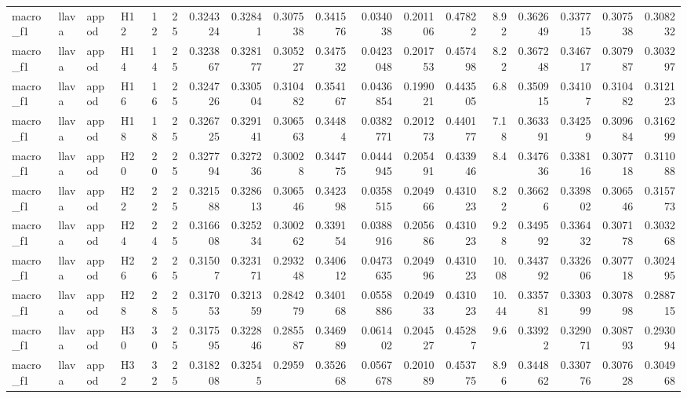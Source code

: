 \begin{longtable}{llllrrrrrrrrrrrrrr}
macro\_f1 & llava & appod & H12 & 12 & 25 & 0.324324 & 0.32841 & 0.307538 & 0.341576 & 0.034038 & 0.201106 & 0.47822 & 8.92 & 0.362649 & 0.337715 & 0.307538 & 0.308232 \\
macro\_f1 & llava & appod & H14 & 14 & 25 & 0.323867 & 0.328177 & 0.305227 & 0.347532 & 0.0423048 & 0.201753 & 0.457498 & 8.22 & 0.367248 & 0.346717 & 0.307987 & 0.303297 \\
macro\_f1 & llava & appod & H16 & 16 & 25 & 0.324726 & 0.330504 & 0.310482 & 0.354167 & 0.0436854 & 0.199021 & 0.443505 & 6.8 & 0.350915 & 0.34107 & 0.310482 & 0.312123 \\
macro\_f1 & llava & appod & H18 & 18 & 25 & 0.326725 & 0.329141 & 0.306563 & 0.34484 & 0.0382771 & 0.201273 & 0.440177 & 7.18 & 0.363391 & 0.34259 & 0.309684 & 0.316299 \\
macro\_f1 & llava & appod & H20 & 20 & 25 & 0.327794 & 0.327236 & 0.30028 & 0.344775 & 0.0444945 & 0.205491 & 0.433946 & 8.4 & 0.347636 & 0.338116 & 0.307718 & 0.311088 \\
macro\_f1 & llava & appod & H22 & 22 & 25 & 0.321588 & 0.328613 & 0.306546 & 0.342398 & 0.0358515 & 0.204966 & 0.431023 & 8.22 & 0.36626 & 0.339802 & 0.306546 & 0.315773 \\
macro\_f1 & llava & appod & H24 & 24 & 25 & 0.316608 & 0.325234 & 0.300262 & 0.339154 & 0.0388916 & 0.205686 & 0.431023 & 9.28 & 0.349592 & 0.336432 & 0.307178 & 0.303268 \\
macro\_f1 & llava & appod & H26 & 26 & 25 & 0.31507 & 0.323171 & 0.293248 & 0.340612 & 0.0473635 & 0.204996 & 0.431023 & 10.08 & 0.343792 & 0.332606 & 0.307718 & 0.302495 \\
macro\_f1 & llava & appod & H28 & 28 & 25 & 0.317053 & 0.321359 & 0.284279 & 0.340168 & 0.0558886 & 0.204933 & 0.431023 & 10.44 & 0.335781 & 0.330399 & 0.307898 & 0.288715 \\
macro\_f1 & llava & appod & H30 & 30 & 25 & 0.317595 & 0.322846 & 0.285587 & 0.346989 & 0.061402 & 0.204527 & 0.45287 & 9.6 & 0.33922 & 0.329071 & 0.308793 & 0.293094 \\
macro\_f1 & llava & appod & H32 & 32 & 25 & 0.318208 & 0.32545 & 0.2959 & 0.352668 & 0.0567678 & 0.201089 & 0.453775 & 8.96 & 0.344862 & 0.330776 & 0.307628 & 0.304968 \\
\end{longtable}
